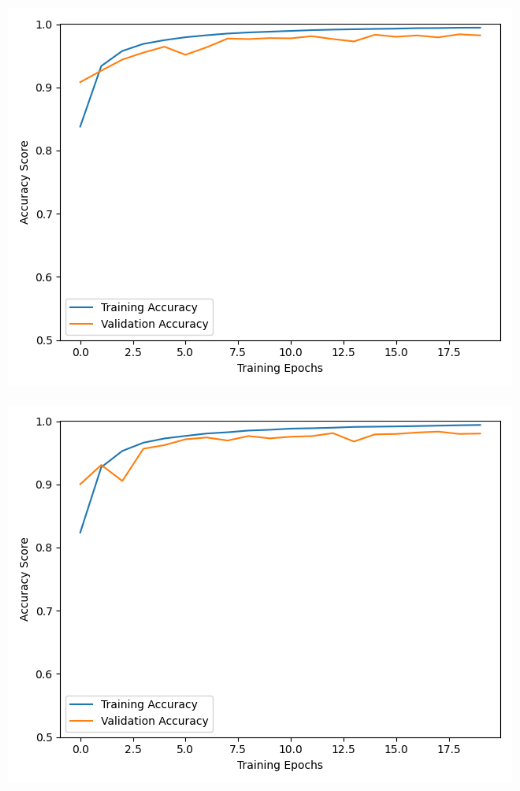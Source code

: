 \documentclass[11pt, letterpaper]{article}
\newenvironment{Figure}
  {\par\medskip\noindent\minipage{\linewidth}}
  {\endminipage\par\medskip}
\begin{document}
\begin{multicols}{2}
  \begin{Figure}
    \centering
    \includegraphics[width=1.0\textwidth]{figures/learning-curve-vgg10-dlib-hflip-combined-125-0001.png}
    \label{learning-curve-vgg10-combined}
  \end{Figure}

  \begin{Figure}
    \centering
    \includegraphics[width=1.0\textwidth]{figures/learning-curve-vgg10-dlib-hflip-rgb-combined-125-0001.png}
    \label{learning-curve-vgg10-rgb-combined}
  \end{Figure}



\end{multicols}
\end{document}
